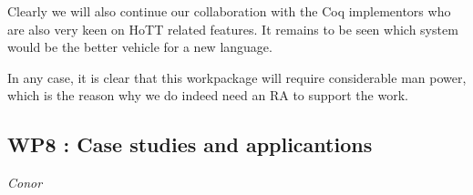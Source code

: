 \documentclass[twocolumn,a4paper,11pt]{article}
\newcommand{\txa}[1]{\textcolor{red}{\textbf{Thorsten:~}#1}}
\begin{document}
Clearly we will also continue our collaboration with the Coq
implementors who are also very keen on HoTT related features. It
remains to be seen which system would be the better vehicle for a new
language.

In any case, it is clear that this workpackage will require
considerable man power, which is the reason why we do indeed need an
RA to support the work. 

\subsection*{WP8 : Case studies and applicantions} 

\emph{Conor}








\end{document}
